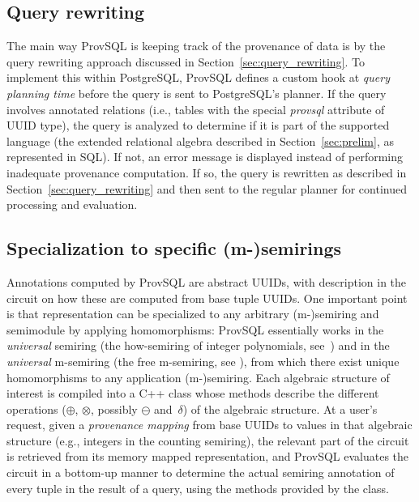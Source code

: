 \subsection{Query rewriting}

The main way ProvSQL is keeping track of the provenance of data is by the
query rewriting approach discussed in
Section~\ref{sec:query_rewriting}. To implement this within PostgreSQL, ProvSQL
defines
a custom hook at \emph{query planning time}
before the query is sent to PostgreSQL's planner. If the query involves
annotated relations (i.e., tables with the special \emph{provsql}
attribute of UUID type), the query is analyzed to determine if it is part of the
supported language (the extended relational algebra described
in Section~\ref{sec:prelim}, as represented in SQL). If not, an error message is
displayed instead of performing inadequate provenance computation. If so,
the query is rewritten as described in Section~\ref{sec:query_rewriting} and
then sent to the regular planner for continued processing and evaluation.

\subsection{Specialization to specific (m-)semirings}

Annotations computed by ProvSQL are abstract UUIDs, with description in
the circuit on how these are computed from base tuple UUIDs. One
important point is that representation can be specialized to any
arbitrary \mbox{(m-)semi}\-ring and semimodule by applying homomorphisms: ProvSQL
essentially works in the \emph{universal} semiring (the how-semiring of
integer polynomials, see~\cite{green2007provenance}) and in the
\emph{universal} m-semiring (the free m-semiring, see
\cite{dblp:journals/japll/geertsp10}), from which there exist unique
homomorphisms to any application (m-)semiring.
Each algebraic structure of interest is compiled into a C++ class
whose methods describe the different operations
($\oplus$, $\otimes$, possibly $\ominus$ and~$\delta$)
of the algebraic
structure.
At a user's request,
given a \emph{provenance
	mapping} from base UUIDs to values in that algebraic structure (e.g.,
  integers in the counting semiring),
the relevant part of the circuit is
retrieved from its memory mapped representation, and ProvSQL
  evaluates the circuit in a bottom-up
manner to determine the actual semiring annotation of every tuple in the
result of a query, using the methods provided by the class.

